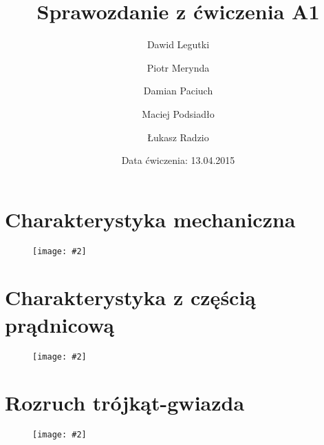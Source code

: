 \documentclass[12pt]{article}
\title{Sprawozdanie z ćwiczenia A1}
\author{ 
Dawid Legutki \and Piotr Merynda \and Damian Paciuch \and Maciej Podsiadło \and Łukasz Radzio}
\date{Data ćwiczenia: 13.04.2015}
\newcommand{\obrazek}[2]
{
	\begin{figure}[H]
	\centering
	\texttt{[image: \#2]}
	\end{figure}
}
\begin{document}
\maketitle

\section{Charakterystyka mechaniczna}

\obrazek{12}{Wykresy/Mechaniczna}


\section{Charakterystyka z częścią prądnicową}
\obrazek{12}{Wykresy/Kloss}



\section{Rozruch trójkąt-gwiazda}
\obrazek{12}{Wykresy/trojkat-gwiazda}

\end{document}
